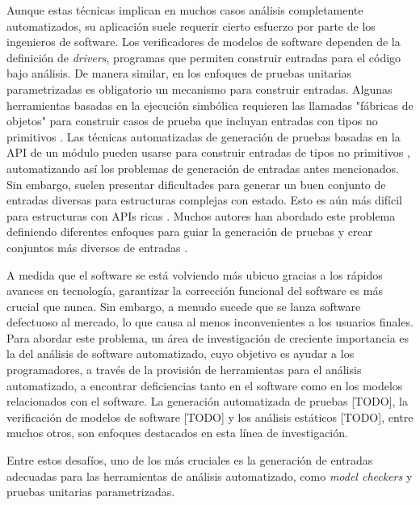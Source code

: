 Aunque estas técnicas implican en muchos casos análisis completamente automatizados, su aplicación suele requerir cierto esfuerzo por parte de los ingenieros de software. Los verificadores de modelos de software dependen de la definición de \emph{drivers}, programas que permiten construir entradas para el código bajo análisis. De manera similar, en los enfoques de pruebas unitarias parametrizadas \cite{Tillmann:2010} es obligatorio un mecanismo para construir entradas. Algunas herramientas basadas en la ejecución simbólica requieren las llamadas "fábricas de objetos" para construir casos de prueba que incluyan entradas con tipos no primitivos \cite{Tillmann:2008}. Las técnicas automatizadas de generación de pruebas basadas en la API de un módulo pueden usarse para construir entradas de tipos no primitivos \cite{Pacheco07, Fraser11}, automatizando así los problemas de generación de entradas antes mencionados. Sin embargo, suelen presentar dificultades para generar un buen conjunto de entradas diversas para estructuras complejas con estado. Esto es aún más difícil para estructuras con APIs ricas \cite{Ponzio:2018}. Muchos autores han abordado este problema definiendo diferentes enfoques para guiar la generación de pruebas y crear conjuntos más diversos de entradas \cite{Ponzio:2018, Ciupa:2008}.











A medida que el software se está volviendo más ubicuo gracias a los rápidos avances en tecnología, garantizar la corrección funcional del software es más crucial que nunca. Sin embargo, a menudo sucede que se lanza software defectuoso al mercado, lo que causa al menos inconvenientes a los usuarios finales. Para abordar este problema, un área de investigación de creciente importancia es la del análisis de software automatizado, cuyo objetivo es ayudar a los programadores, a través de la provisión de herramientas para el análisis automatizado, a encontrar deficiencias tanto en el software como en los modelos relacionados con el software. La generación automatizada de pruebas [TODO], la verificación de modelos de software [TODO] y los análisis estáticos [TODO], entre muchos otros, son enfoques destacados en esta línea de investigación.

Entre estos desafíos, uno de los más cruciales es la generación de entradas adecuadas para las herramientas de análisis automatizado, como \emph{model checkers} y pruebas unitarias parametrizadas.

